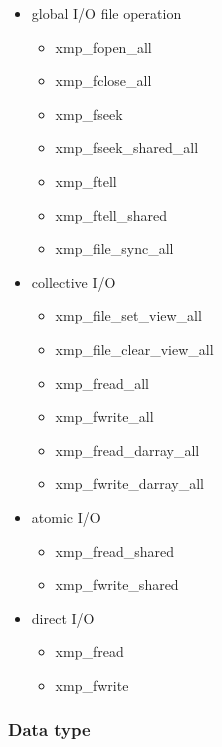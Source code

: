    \begin{itemize}
    \item global I/O file operation
    \begin{itemize}
     \item xmp\_fopen\_all
     \item xmp\_fclose\_all
     \item xmp\_fseek
     \item xmp\_fseek\_shared\_all
     \item xmp\_ftell
     \item xmp\_ftell\_shared
     \item xmp\_file\_sync\_all
    \end{itemize}
    \item collective I/O
    \begin{itemize}
     \item xmp\_file\_set\_view\_all
     \item xmp\_file\_clear\_view\_all
     \item xmp\_fread\_all
     \item xmp\_fwrite\_all
     \item xmp\_fread\_darray\_all
     \item xmp\_fwrite\_darray\_all
    \end{itemize}
    \item atomic I/O
    \begin{itemize}
     \item xmp\_fread\_shared
     \item xmp\_fwrite\_shared
    \end{itemize}
    \item direct I/O
    \begin{itemize}
     \item xmp\_fread
     \item xmp\_fwrite
    \end{itemize}
   \end{itemize}

   \clearpage
   
   \subsubsection{Data type}

